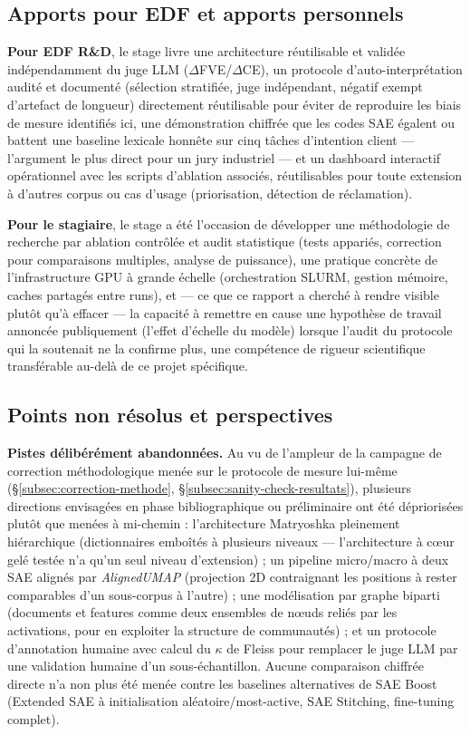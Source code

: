 \documentclass[11pt]{article}
\begin{document}
\subsection{Apports pour EDF et apports personnels}

\textbf{Pour EDF R\&D}, le stage livre une architecture réutilisable et validée
indépendamment du juge LLM ($\Delta$FVE/$\Delta$CE), un protocole d'auto-interprétation
audité et documenté (sélection stratifiée, juge indépendant, négatif exempt d'artefact
de longueur) directement réutilisable pour éviter de reproduire les biais de mesure
identifiés ici, une démonstration chiffrée que les codes SAE égalent ou battent une
baseline lexicale honnête sur cinq tâches d'intention client --- l'argument le plus
direct pour un jury industriel --- et un dashboard interactif opérationnel avec les
scripts d'ablation associés, réutilisables pour toute extension à d'autres corpus ou
cas d'usage (priorisation, détection de réclamation).

\textbf{Pour le stagiaire}, le stage a été l'occasion de développer une méthodologie de
recherche par ablation contrôlée et audit statistique (tests appariés, correction pour
comparaisons multiples, analyse de puissance), une pratique concrète de l'infrastructure
GPU à grande échelle (orchestration SLURM, gestion mémoire, caches partagés entre runs),
et --- ce que ce rapport a cherché à rendre visible plutôt qu'à effacer --- la capacité à
remettre en cause une hypothèse de travail annoncée publiquement (l'effet d'échelle du
modèle) lorsque l'audit du protocole qui la soutenait ne la confirme plus, une compétence
de rigueur scientifique transférable au-delà de ce projet spécifique.

\subsection{Points non résolus et perspectives}

\textbf{Pistes délibérément abandonnées.} Au vu de l'ampleur de la campagne
de correction méthodologique menée sur le protocole de mesure lui-même
(\S\ref{subsec:correction-methode}, \S\ref{subsec:sanity-check-resultats}),
plusieurs directions envisagées en phase bibliographique ou préliminaire ont
été dépriorisées plutôt que menées à mi-chemin : l'architecture Matryoshka
pleinement hiérarchique (dictionnaires emboîtés à plusieurs niveaux ---
l'architecture à cœur gelé testée n'a qu'un seul niveau d'extension) ; un
pipeline micro/macro à deux SAE alignés par \emph{AlignedUMAP} (projection 2D
contraignant les positions à rester comparables d'un sous-corpus à l'autre) ;
une modélisation par graphe biparti (documents et features comme deux
ensembles de nœuds reliés par les activations, pour en exploiter la structure
de communautés) ; et un protocole d'annotation humaine avec calcul du
$\kappa$ de Fleiss pour remplacer le juge LLM par une validation humaine d'un
sous-échantillon. Aucune comparaison chiffrée directe n'a non plus été menée
contre les baselines alternatives de SAE Boost (Extended SAE à
initialisation aléatoire/most-active, SAE Stitching, fine-tuning complet).
\end{document}

